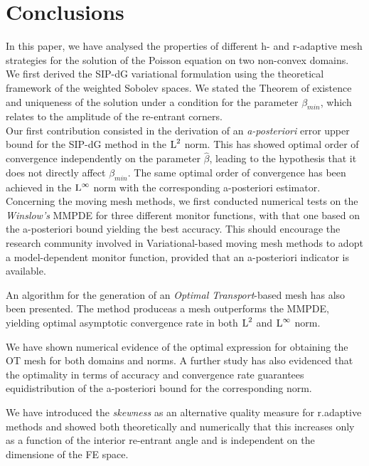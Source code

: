 \documentclass[a4paper,11pt]{article}
\begin{document}
{\clearpage
\newpage

\section{Conclusions}
\label{sec:Conclusion}

In this paper, we have analysed the properties of different h- and r-adaptive mesh strategies for the solution of the Poisson equation on two non-convex domains. We first derived the SIP-dG variational formulation using the theoretical framework of the weighted Sobolev spaces. We stated the Theorem of existence and uniqueness of the solution under a condition for the parameter $\beta_{min}$, which relates to the amplitude of the re-entrant corners.\\

Our first contribution consisted in the derivation of an \textit{a-posteriori} error upper bound for the SIP-dG method in the $\operatorname L^{2}$ norm. This has showed optimal order of convergence independently on the parameter $\hat{\beta}$, leading to the hypothesis that it  does not directly affect $\beta_{min}$. The same optimal order of convergence has been achieved in the $\operatorname L^{\infty}$ norm with the corresponding a-posteriori estimator.\\

Concerning the moving mesh methods, we first conducted numerical tests on the \textit{Winslow's} MMPDE for three different monitor functions, with that one based on the a-posteriori bound yielding the best accuracy. This should encourage the research community involved in Variational-based moving mesh methods to adopt a model-dependent monitor function, provided that an a-posteriori indicator is available.

An algorithm for the generation of an \textit{Optimal Transport}-based mesh has also been presented. The method produceas a mesh outperforms the  MMPDE, yielding optimal asymptotic convergence rate in both $\operatorname L^{2}$ and $\operatorname L^{\infty}$ norm.

We have shown numerical evidence of the optimal expression for obtaining the OT mesh for both domains and norms. A further study has also evidenced that the optimality in terms of accuracy and convergence rate guarantees equidistribution of the a-posteriori bound for the corresponding norm.

We have introduced the \textit{skewness} as an alternative quality measure for r.adaptive methods and showed both theoretically and numerically that this increases only as a function of the interior re-entrant angle and is independent on the dimensione of the FE space.\\ 

}
\end{document}
